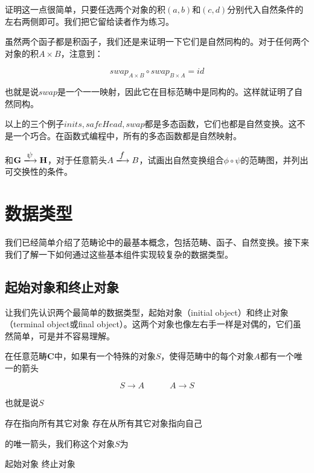 \documentclass{article}
\begin{document}
证明这一点很简单，只要任选两个对象的积$(a, b)$和$(c, d)$分别代入自然条件的左右两侧即可。我们把它留给读者作为练习。

虽然两个函子都是积函子，我们还是来证明一下它们是自然同构的。对于任何两个对象的积$A \times B$，注意到：

\[
swap_{A \times B} \circ swap_{B \times A} = id
\]

也就是说$swap$是一个一一映射，因此它在目标范畴中是同构的。这样就证明了自然同构。

以上的三个例子$inits, safeHead, swap$都是多态函数，它们也都是自然变换。这不是一个巧合。在函数式编程中，所有的多态函数都是自然映射\cite{Wadler-1989}。

\begin{Exercise}
和$\mathbf{G} \arrowto{\psi} \mathbf{H}$，对于任意箭头$A \arrowto{f} B$，试画出自然变换组合$\phi \circ \psi$的范畴图，并列出可交换性的条件。
\end{Exercise}

\section{数据类型}

我们已经简单介绍了范畴论中的最基本概念，包括范畴、函子、自然变换。接下来我们了解一下如何通过这些基本组件实现较复杂的数据类型。

\subsection{起始对象和终止对象}
让我们先认识两个最简单的数据类型，起始对象（initial object）和终止对象（terminal object或final object）。这两个对象也像左右手一样是对偶的，它们虽然简单，可是并不容易理解。

\begin{definition}
在任意范畴$\pmb{C}$中，如果有一个特殊的对象$S$，使得范畴中的每个对象$A$都有一个唯一的箭头

\[
  S \longrightarrow A \quad \quad \quad A \longrightarrow S
\]

也就是说$S$

\begin{center}
  存在指向所有其它对象  \quad \quad \quad 存在从所有其它对象指向自己
\end{center}
的唯一箭头，我们称这个对象$S$为

\begin{center}
  起始对象 \quad \quad \quad 终止对象
\end{center}
\end{definition}
\end{document}
